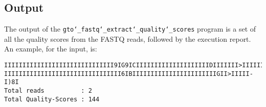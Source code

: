 \subsection*{Output}
The output of the \texttt{gto\char`_fastq\char`_extract\char`_quality\char`_scores} program is a set of all the quality scores from the FASTQ reads, followed by the execution report.\\
An example, for the input, is:
\begin{lstlisting}
IIIIIIIIIIIIIIIIIIIIIIIIIIIIII9IG9ICIIIIIIIIIIIIIIIIIIIIDIIIIIII>IIIIII/
IIIIIIIIIIIIIIIIIIIIIIIIIIIIIIII6IBIIIIIIIIIIIIIIIIIIIIIIIGII>IIIII-I)8I
Total reads          : 2
Total Quality-Scores : 144
\end{lstlisting}
